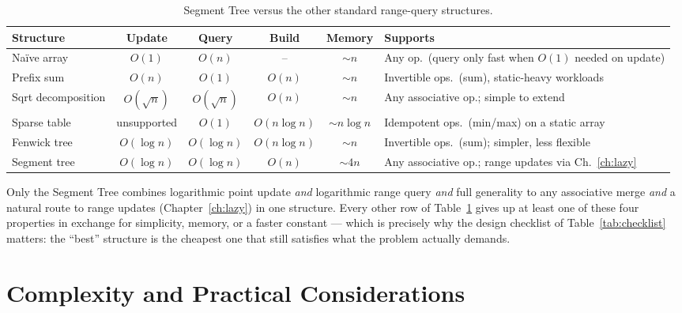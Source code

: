 \documentclass[
  11pt,
  a4paper,
  twoside=false,
  numbers=noenddot,
  headings=big,
  parskip=half,
  toc=bibliography,
  toc=listof,
  bibliography=totoc
]{scrreprt}
\newcommand{\Oh}[1]{O\!\left(#1\right)}
\newcommand{\tblhead}[1]{\textbf{\sffamily #1}}
\begin{document}
\begin{table}[H]
\centering
\caption{Segment Tree versus the other standard range-query structures.}
\label{tab:comparison-full}
\begin{tabular}{lccccl}
\toprule
\tblhead{Structure} & \tblhead{Update} & \tblhead{Query} & \tblhead{Build} & \tblhead{Memory} & \tblhead{Supports} \\
\midrule
Na\"ive array        & $\Oh{1}$        & $\Oh{n}$        & --            & $\sim n$   & Any op.\ (query only fast when $\Oh{1}$ needed on update) \\
Prefix sum           & $\Oh{n}$        & $\Oh{1}$        & $\Oh{n}$      & $\sim n$   & Invertible ops.\ (sum), static-heavy workloads \\
Sqrt decomposition   & $\Oh{\sqrt n}$  & $\Oh{\sqrt n}$  & $\Oh{n}$      & $\sim n$   & Any associative op.; simple to extend \\
Sparse table         & unsupported     & $\Oh{1}$        & $\Oh{n\log n}$& $\sim n\log n$ & Idempotent ops.\ (min/max) on a static array \\
Fenwick tree          & $\Oh{\log n}$   & $\Oh{\log n}$   & $\Oh{n\log n}$ & $\sim n$   & Invertible ops.\ (sum); simpler, less flexible \\
\rowcolor{lightblue!30}
Segment tree          & $\Oh{\log n}$   & $\Oh{\log n}$   & $\Oh{n}$      & $\sim 4n$  & Any associative op.; range updates via Ch.~\ref{ch:lazy} \\
\bottomrule
\end{tabular}
\end{table}

\begin{remark}
Only the Segment Tree combines logarithmic point update \emph{and} logarithmic range query \emph{and} full generality to any associative merge \emph{and} a natural route to range updates (Chapter~\ref{ch:lazy}) in one structure. Every other row of Table~\ref{tab:comparison-full} gives up at least one of these four properties in exchange for simplicity, memory, or a faster constant --- which is precisely why the design checklist of Table~\ref{tab:checklist} matters: the ``best'' structure is the cheapest one that still satisfies what the problem actually demands.
\end{remark}

\chapter{Complexity and Practical Considerations}
\label{ch:practical}
\end{document}
